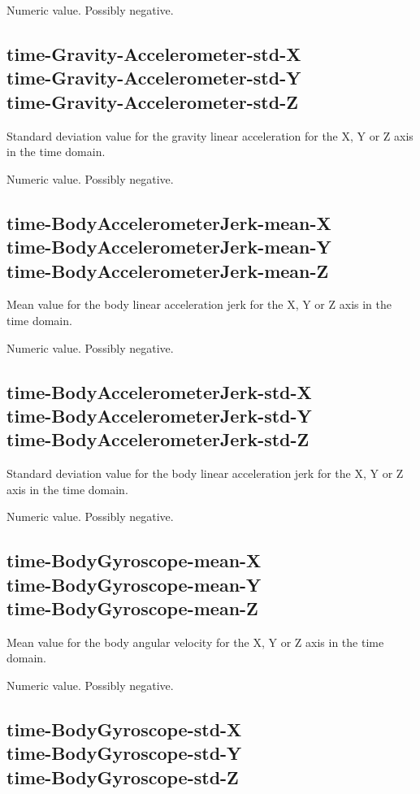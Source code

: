\documentclass[a4paper,10pt]{report}
\begin{document}
Numeric value. Possibly negative.

\subsection*{time-Gravity-Accelerometer-std-X\\time-Gravity-Accelerometer-std-Y\\time-Gravity-Accelerometer-std-Z} 

Standard deviation value for the gravity linear acceleration for the X, Y or Z axis in the time domain.

Numeric value. Possibly negative.

\subsection*{time-BodyAccelerometerJerk-mean-X\\time-BodyAccelerometerJerk-mean-Y\\time-BodyAccelerometerJerk-mean-Z} 

Mean value for the body linear acceleration jerk for the X, Y or Z axis in the time domain.

Numeric value. Possibly negative.

\subsection*{time-BodyAccelerometerJerk-std-X\\time-BodyAccelerometerJerk-std-Y\\time-BodyAccelerometerJerk-std-Z} 

Standard deviation value for the body linear acceleration jerk for the X, Y or Z axis in the time domain.

Numeric value. Possibly negative.

\subsection*{time-BodyGyroscope-mean-X\\time-BodyGyroscope-mean-Y\\time-BodyGyroscope-mean-Z} 

Mean value for the body angular velocity for the X, Y or Z axis in the time domain.

Numeric value. Possibly negative.

\subsection*{time-BodyGyroscope-std-X\\time-BodyGyroscope-std-Y\\time-BodyGyroscope-std-Z} 
\end{document}
